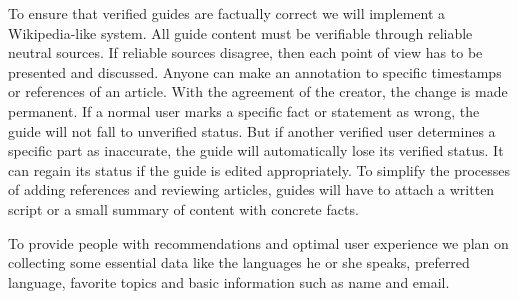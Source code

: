 \documentclass[12pt]{article}
\theoremstyle{definition}
\newenvironment{text}{
}{}
\begin{document}
\begin{text}
To ensure that verified guides are factually correct we will implement a Wikipedia-like system.
All guide content must be verifiable through reliable neutral sources. If reliable sources disagree, then each point of view has to be presented and discussed. 
Anyone can make an annotation to specific timestamps or references of an article. With the agreement of the creator, the change is made permanent.  If a normal user marks a specific fact or statement as wrong, the guide will not fall to unverified status. But if another verified user determines a specific part as inaccurate, the guide will automatically lose its verified status. 
It can regain its status if the guide is edited appropriately.
To simplify the processes of adding references and reviewing articles, guides will have to attach a written script or a small summary of content with concrete facts.

To provide people with recommendations and optimal user experience we plan on collecting some essential data like the languages he or she speaks, preferred language, favorite topics and basic information such as name and email.\newline

\end{text}
\end{document}

